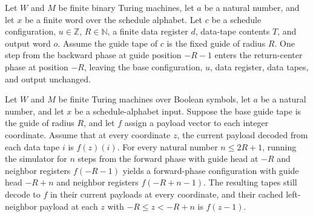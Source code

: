 \begin{lemma}
\label{Complexity.dataCfg_backward_turn}
\leanok
{}
Let $W$ and $M$ be finite binary Turing machines, let $a$ be a natural number, and let
$x$ be a finite word over the schedule alphabet. Let $c$ be a schedule configuration,
$u\in\mathbb{Z}$, $R\in\mathbb{N}$, a finite data register $d$, data-tape contents $T$,
and output word $o$. Assume the guide tape of $c$ is the fixed guide of radius $R$. One
step from the backward phase at guide position $-R-1$ enters the return-center phase at
position $-R$, leaving the base configuration, $u$, data register, data tapes, and
output unchanged.
\end{lemma}

\begin{lemma}
\label{Complexity.dataCfg_forward_prefix}
\leanok
{}
Let $W$ and $M$ be finite Turing machines over Boolean symbols, let $a$ be a natural
number, and let $x$ be a schedule-alphabet input. Suppose the base guide tape is the
guide of radius $R$, and let $f$ assign a payload vector to each integer coordinate.
Assume that at every coordinate $z$, the current payload decoded from each data tape $i$
is $f(z)(i)$. For every natural number $n\le 2R+1$, running the simulator for $n$ steps
from the forward phase with guide head at $-R$ and neighbor registers $f(-R-1)$ yields a
forward-phase configuration with guide head $-R+n$ and neighbor registers $f(-R+n-1)$.
The resulting tapes still decode to $f$ in their current payloads at every coordinate,
and their cached left-neighbor payload at each $z$ with $-R\le z<-R+n$ is $f(z-1)$.
\end{lemma}

